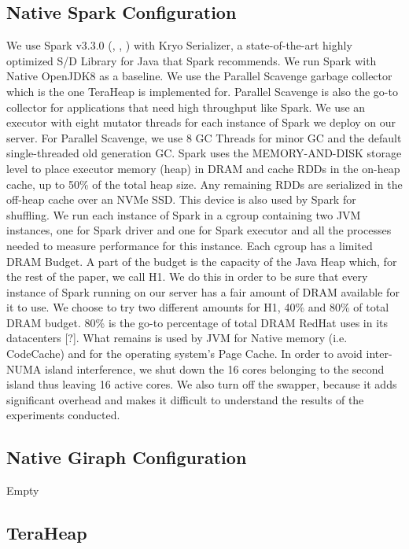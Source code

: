 \subsection{Native Spark Configuration}
We use Spark v3.3.0 (\cite{Tuning}, \cite{Conf}, \cite{Monitoring}) with Kryo Serializer, a state-of-the-art highly
optimized S/D Library for Java that Spark recommends. We run Spark
with Native OpenJDK8 as a baseline. We use the Parallel Scavenge
garbage collector which is the one TeraHeap is implemented for.
Parallel Scavenge is also the go-to collector for applications that
need high throughput like Spark. We use an executor with eight mutator
threads for each instance of Spark we deploy on our server. For
Parallel Scavenge, we use 8 GC Threads for minor GC and the default
single-threaded old generation GC. Spark uses the MEMORY-AND-DISK
storage level to place executor memory (heap) in DRAM and cache RDDs
in the on-heap cache, up to 50\% of the total heap size. Any remaining
RDDs are serialized in the off-heap cache over an NVMe SSD. This
device is also used by Spark for shuffling. We run each instance of
Spark in a cgroup containing two JVM instances, one for Spark driver
and one for Spark executor and all the processes needed to measure
performance for this instance. Each cgroup has a limited DRAM Budget.
A part of the budget is the capacity of the Java Heap which, for the
rest of the paper, we call H1. We do this in order to be sure that
every instance of Spark running on our server has a fair amount of
DRAM available for it to use. We choose to try two different amounts
for H1, 40\% and 80\% of total DRAM budget. 80\% is the go-to
percentage of total DRAM RedHat uses in its datacenters [?]. What
remains is used by JVM for Native memory (i.e. CodeCache) and for the
operating system's Page Cache. In order to avoid inter-NUMA island
interference, we shut down the 16 cores belonging to the second island
thus leaving 16 active cores. We also turn off the swapper, because it
adds significant overhead and makes it difficult to understand the
results of the experiments conducted.

\subsection{Native Giraph Configuration}
Empty

\subsection{TeraHeap}
